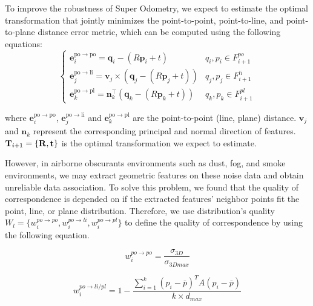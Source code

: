 To improve the robustness of Super Odometry, we expect to estimate the optimal transformation that jointly minimizes the point-to-point, point-to-line, and point-to-plane distance error metric, which can be computed using the following equations:
\begin{equation}
	\begin{cases}
		\mathbf{e}_{i}^{\mathrm{po} \rightarrow \mathrm{po}}=\mathbf{q}_{i}-(R\mathbf{p}_{i}+t) & \text{$q_{i},p_{i}\in F^{po}_{i+1}$}
		\\
		\mathbf{e}_{j}^{\mathrm{po} \rightarrow \mathrm{li}}=\mathbf{v}_{j} \times\left(\mathbf{q}_{j}-(R\mathbf{p}_{j}+t)\right)
		& \text{$q_{j},p_{j}\in F^{li}_{i+1}$}
		\\
		\mathbf{e}_{k}^{\mathrm{po} \rightarrow \mathrm{pl}}=\mathbf{n}_{k}^{\top}\left(\mathbf{q}_{k}- (R\mathbf{p}_{k}+t)\right) 
		& \text{$q_{k},p_{k}\in F^{pl}_{i+1}$}
	\end{cases}
\end{equation}

where $\mathbf{e}_{i}^{\mathrm{po} \rightarrow \mathrm{po}}$, $	\mathbf{e}_{j}^{\mathrm{po} \rightarrow \mathrm{li}}$ and $\mathbf{e}_{k}^{\mathrm{po} \rightarrow \mathrm{pl}}$ are the point-to-point (line, plane) distance. $\mathbf{v}_{j}$ and $\mathbf{n}_{k}$ represent the corresponding principal and normal direction of features. $\mathbf{T}_{i+1}=\{\bold{R}, \bold{t}\}$ is the optimal transformation we expect to estimate. 

However, in airborne obscurants environments such as dust, fog, and smoke environments, we may extract geometric features on these noise data and obtain unreliable data association. To solve this problem, we found that the quality of correspondence is depended on if the extracted features' neighbor points fit the point, line, or plane distribution. Therefore, we use distribution's quality ${W}_{l}=\{w_i^{po \to po}, w_i^{po \to li},w_i^{po \to pl}\}$ to define the quality of correspondence by using the following equation.  

\begin{equation}
\label{eq:w1}
{w_i^{po \to po} = \frac{{{\sigma _{3D}}}}{{{\sigma _{3Dmax}}}}}
\end{equation}


\begin{equation}
\label{eq:w2}
{w_i^{po \to li/pl} = 1 - \frac{{\sum\limits_{i = 1}^k {{{\left( {{p_i} - \bar p} \right)}^T}A\left( {{p_i} - \bar p} \right)} }}{{k \times {d_{max}}}}}
\end{equation}


